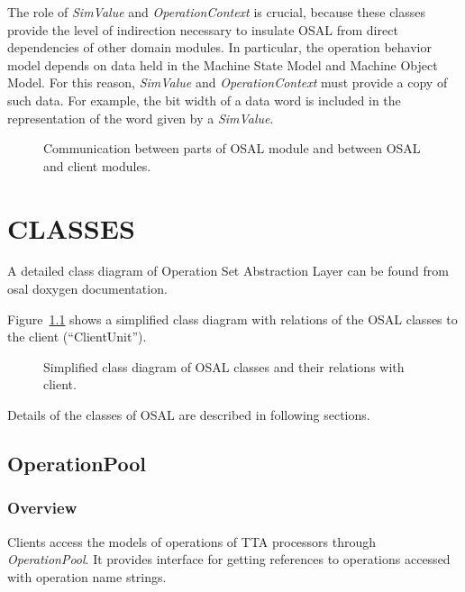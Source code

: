 \documentclass[a4paper,twoside]{tce}
\begin{document}
The role of \emph{SimValue} and \emph{OperationContext} is crucial, because
these classes provide the level of indirection necessary to insulate OSAL
from direct dependencies of other domain modules.  In particular, the
operation behavior model depends on data held in the Machine State Model and
Machine Object Model.  For this reason, \emph{SimValue} and
\emph{OperationContext} must provide a copy of such data.  For example, the
bit width of a data word is included in the representation of the word given
by a \emph{SimValue}.


\begin{figure}[tb]
  \centerline{}
  \caption{Communication between parts of OSAL module and between OSAL and
    client modules.}
  \label{fig:OSAL-communication}
\end{figure}

\chapter{CLASSES}

A detailed class diagram of Operation Set Abstraction Layer can be found
from osal doxygen documentation.

Figure~\ref{fig:OSAL_class_diagram_simple} shows a simplified class diagram 
with relations of the OSAL classes to the client (``ClientUnit'').

\begin{figure}[tb]
  \centerline{}
  \caption{Simplified class diagram of OSAL classes and their relations with
    client.}
  \label{fig:OSAL_class_diagram_simple}
\end{figure}

Details of the classes of OSAL are described in following sections.

\section{OperationPool}
\label{sec:operationPool}

\subsection{Overview}

Clients access the models of operations of TTA processors through
\emph{OperationPool}.  It provides interface for getting references to
operations accessed with operation name strings.
\end{document}
